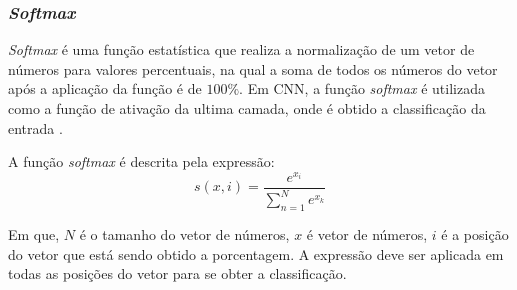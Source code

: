 \subsubsection{\textit{Softmax}}
\textit{Softmax} é uma função estatística que realiza a normalização de um vetor de números para valores percentuais, na qual a soma de todos os números do vetor após a aplicação da função é de $100\%$. Em CNN, a função \textit{softmax} é utilizada como a função de ativação da ultima camada, onde é obtido a classificação da entrada \cite{bishop2007pattern}. 
\par A função \textit{softmax} é descrita pela expressão: \[s(x,i)=\frac{e^{x_i}}{\sum_{n=1}^{N} e^{x_k}}\] 
\par Em que, $N$ é o tamanho do vetor de números, $x$ é vetor de números, $i$ é a posição do vetor que está sendo obtido a porcentagem. A expressão deve ser aplicada em todas as posições do vetor para se obter a classificação.
